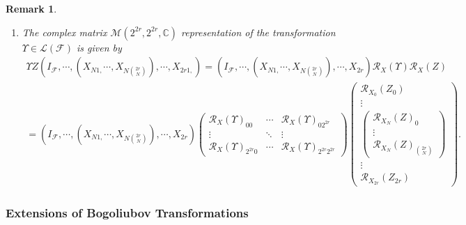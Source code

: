 \documentclass[aps,preprint]{revtex4}
\newtheorem{remark}[theorem]{Remark}
\begin{document}
\begin{remark}
\begin{enumerate}
\item The complex matrix $\mathcal{M}\left( 2^{2r},2^{2r},\mathbb{C}\right) $
representation of the transformation $\Upsilon \in \mathcal{L}\left( 
\mathcal{F}\right) $ is given by 
\begin{gather}
\Upsilon Z\left( I_{\mathcal{F}},\cdots ,\left( X_{N1,}\cdots ,X_{N\binom{2r%
}{N}}\right) ,\cdots ,X_{2r1,}\right) =\left( I_{\mathcal{F}},\cdots ,\left(
X_{N1,}\cdots ,X_{N\binom{2r}{N}}\right) ,\cdots ,X_{2r}\right) \mathcal{R}%
_{X}\left( \Upsilon \right) \mathcal{R}_{X}\left( Z\right) \\
=\left( I_{\mathcal{F}},\cdots ,\left( X_{N1,}\cdots ,X_{N\binom{2r}{N}%
}\right) ,\cdots ,X_{2r}\right) \left( 
\begin{array}{ccc}
\mathcal{R}_{X}\left( \Upsilon \right) _{00} & \cdots & \mathcal{R}%
_{X}\left( \Upsilon \right) _{02^{2r}} \\ 
\vdots & \ddots & \vdots \\ 
\mathcal{R}_{X}\left( \Upsilon \right) _{2^{2r}0} & \cdots & \mathcal{R}%
_{X}\left( \Upsilon \right) _{2^{2r}2^{2r}}%
\end{array}%
\right) \left( 
\begin{array}{c}
\mathcal{R}_{X_{0}}\left( Z_{0}\right) \\ 
\vdots \\ 
\left( 
\begin{array}{c}
\mathcal{R}_{X_{N}}\left( Z\right) _{0} \\ 
\vdots \\ 
\mathcal{R}_{X_{N}}\left( Z\right) _{\binom{2r}{N}}%
\end{array}%
\right) \\ 
\vdots \\ 
\mathcal{R}_{X_{2r}}\left( Z_{2r}\right)%
\end{array}%
\right) .
\end{gather}
\end{enumerate}
\end{remark}

\subsubsection{Extensions of Bogoliubov Transformations \label{Extensions of
Bogoliubov Transformations}}
\end{document}
